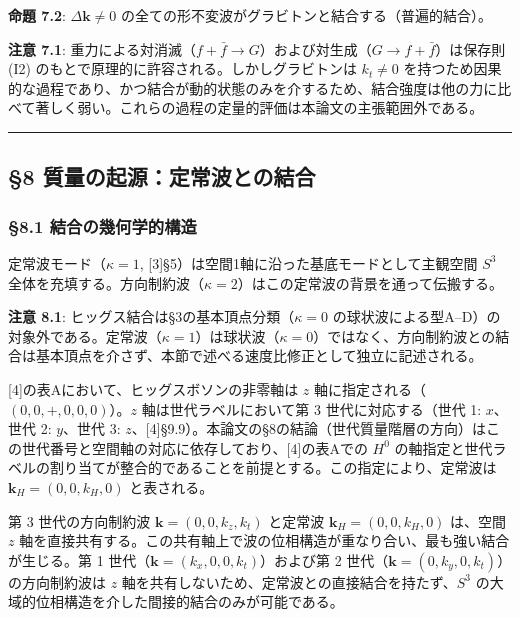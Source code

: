 \documentclass[
  a4paper,11pt]{ltjsarticle}
\theoremstyle{definition}
\theoremstyle{remark}
\begin{document}
\textbf{命題 7.2}: \(\Delta\mathbf{k} \neq 0\)
の全ての形不変波がグラビトンと結合する（普遍的結合）。

\textbf{注意 7.1}:
重力による対消滅（\(f + \bar{f} \to G\)）および対生成（\(G \to f + \bar{f}\)）は保存則
(I2) のもとで原理的に許容される。しかしグラビトンは \(k_t \neq 0\)
を持つため因果的な過程であり、かつ結合が動的状態のみを介するため、結合強度は他の力に比べて著しく弱い。これらの過程の定量的評価は本論文の主張範囲外である。

\begin{center}\rule{0.5\linewidth}{0.5pt}\end{center}

\subsection{§8
質量の起源：定常波との結合}\label{ux8ceaux91cfux306eux8d77ux6e90ux5b9aux5e38ux6ce2ux3068ux306eux7d50ux5408}

\subsubsection{§8.1
結合の幾何学的構造}\label{ux7d50ux5408ux306eux5e7eux4f55ux5b66ux7684ux69cbux9020}

定常波モード（\(\kappa = 1\),
{[}3{]}§5）は空間1軸に沿った基底モードとして主観空間 \(S^3\)
全体を充填する。方向制約波（\(\kappa = 2\)）はこの定常波の背景を通って伝搬する。

\textbf{注意 8.1}: ヒッグス結合は§3の基本頂点分類（\(\kappa = 0\)
の球状波による型A--D）の対象外である。定常波（\(\kappa = 1\)）は球状波（\(\kappa = 0\)）ではなく、方向制約波との結合は基本頂点を介さず、本節で述べる速度比修正として独立に記述される。

{[}4{]}の表Aにおいて、ヒッグスボソンの非零軸は \(z\)
軸に指定される（\((0, 0, +, 0, 0, 0)\)）。\(z\) 軸は世代ラベルにおいて第
3 世代に対応する（世代 1: \(x\)、世代 2: \(y\)、世代 3:
\(z\)、{[}4{]}§9.9）。本論文の§8の結論（世代質量階層の方向）はこの世代番号と空間軸の対応に依存しており、{[}4{]}の表Aでの
\(H^0\)
の軸指定と世代ラベルの割り当てが整合的であることを前提とする。この指定により、定常波は
\(\mathbf{k}_H = (0, 0, k_H, 0)\) と表される。

第 3 世代の方向制約波 \(\mathbf{k} = (0, 0, k_z, k_t)\) と定常波
\(\mathbf{k}_H = (0, 0, k_H, 0)\) は、空間 \(z\)
軸を直接共有する。この共有軸上で波の位相構造が重なり合い、最も強い結合が生じる。第
1 世代（\(\mathbf{k} = (k_x, 0, 0, k_t)\)）および第 2
世代（\(\mathbf{k} = (0, k_y, 0, k_t)\)）の方向制約波は \(z\)
軸を共有しないため、定常波との直接結合を持たず、\(S^3\)
の大域的位相構造を介した間接的結合のみが可能である。
\end{document}
